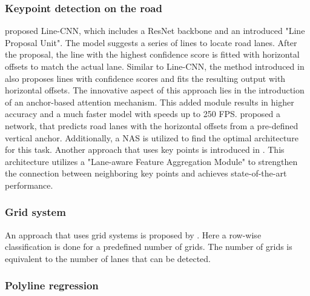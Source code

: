 \subsubsection{Keypoint detection on the road}

\cite{LineCNN2020} proposed Line-CNN, which includes a ResNet backbone and an introduced "Line Proposal Unit".
The model suggests a series of lines to locate road lanes.
After the proposal, the line with the highest confidence score is fitted with horizontal offsets to match the actual lane.
Similar to Line-CNN, the method introduced in \cite{KeepEyesOnLane2021} also proposes lines with confidence scores and fits the resulting output with horizontal offsets.
The innovative aspect of this approach lies in the introduction of an anchor-based attention mechanism.
This added module results in higher accuracy and a much faster model with speeds up to 250 \ac{FPS}.
\cite{CurveLaneNAS2020} proposed a network, that predicts road lanes with the horizontal offsets from a pre-defined vertical anchor.
Additionally, a \ac{NAS} is utilized to find the optimal architecture for this task.
Another approach that uses key points is introduced in \cite{GANet2022}.
This architecture utilizes a "Lane-aware Feature Aggregation Module" to strengthen the connection between neighboring key points and achieves state-of-the-art performance.

\subsubsection{Grid system}

An approach that uses grid systems is proposed by \cite{laneDetectionGrid2020}.
Here a row-wise classification is done for a predefined number of grids.
The number of grids is equivalent to the number of lanes that can be detected.

\subsubsection{Polyline regression}

